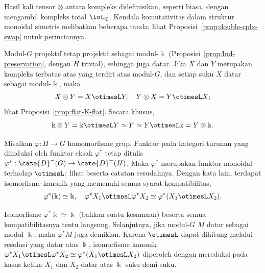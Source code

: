 Hasil kali tensor $\otimes$ antara kompleks didefinisikan, seperti biasa,
dengan mengambil kompleks total $\tot_{\oplus}$. Kendala komutativitas dalam
struktur monoidal simetris melibatkan beberapa tanda; lihat
Proposisi~\ref{prop:double-cplx-swap} untuk perinciannya.

Modul-$G$ projektif tetap projektif sebagai modul-$\Bbbk$
(Proposisi~\ref{prop:Ind-preservation}, dengan $H$ trivial), sehingga juga
datar. Jika $X$ dan $Y$ merupakan kompleks terbatas atas yang terdiri atas
modul-$G$, dan setiap suku $X$ datar sebagai modul-$\Bbbk$, maka
\[ X \otimes Y = X \otimesL Y, \quad Y \otimes X = Y \otimesL X; \]
lihat Proposisi~\ref{prop:flat-K-flat}. Secara khusus,
\begin{equation}\label{eqn:G-mod-tensor-unit}
	\Bbbk \otimes Y = \Bbbk \otimesL Y \simeq Y \simeq Y \otimesL \Bbbk = Y \otimes \Bbbk.
\end{equation}

\begin{lema}\label{prop:group-pullback-monoidal}
	Misalkan $\varphi:H\to G$ homomorfisme grup. Funktor pada kategori turunan
	yang diinduksi oleh funktor eksak $\varphi^*$ tetap ditulis
	$\varphi^*:\cate{D}^-(G)\to\cate{D}^-(H)$. Maka $\varphi^*$ merupakan
	funktor monoidal terhadap $\otimesL$; lihat
	\cite[Definisi 3.1.7]{Li1} beserta catatan sesudahnya. Dengan kata lain,
	terdapat isomorfisme kanonik yang memenuhi semua syarat kompatibilitas,
	\[ \varphi^*(\Bbbk) \simeq \Bbbk, \quad \varphi^* X_1 \otimesL \varphi^* X_2 \simeq \varphi^* (X_1 \otimesL X_2). \]
\end{lema}

\begin{bukti}
	Isomorfisme $\varphi^*\Bbbk\simeq\Bbbk$ (bahkan suatu kesamaan) beserta
	semua kompatibilitasnya tentu langsung. Selanjutnya, jika modul-$G$ $M$
	datar sebagai modul-$\Bbbk$, maka $\varphi^*M$ juga demikian. Karena
	$\otimesL$ dapat dihitung melalui resolusi yang datar atas $\Bbbk$,
	isomorfisme kanonik
	$\varphi^*X_1\otimesL\varphi^*X_2\simeq\varphi^*(X_1\otimesL X_2)$
	diperoleh dengan mereduksi pada kasus ketika $X_1$ dan $X_2$ datar atas
	$\Bbbk$ suku demi suku.
\end{bukti}

